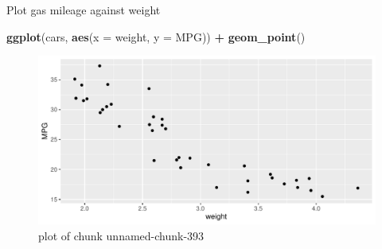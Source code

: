 \documentclass[ignorenonframetext,]{beamer}
\newenvironment{Shaded}{\begin{snugshade}}{\end{snugshade}}
\newcommand{\DataTypeTok}[1]{\textcolor[rgb]{0.13,0.29,0.53}{#1}}
\newcommand{\KeywordTok}[1]{\textcolor[rgb]{0.13,0.29,0.53}{\textbf{#1}}}
\newcommand{\NormalTok}[1]{#1}
\newcommand{\OperatorTok}[1]{\textcolor[rgb]{0.81,0.36,0.00}{\textbf{#1}}}
\newcommand{\StringTok}[1]{\textcolor[rgb]{0.31,0.60,0.02}{#1}}
\begin{document}
\begin{frame}[fragile]{Plot gas mileage against weight}
\protect\hypertarget{plot-gas-mileage-against-weight}{}

\begin{Shaded}
\begin{Highlighting}[]
\KeywordTok{ggplot}\NormalTok{(cars, }\KeywordTok{aes}\NormalTok{(}\DataTypeTok{x =}\NormalTok{ weight, }\DataTypeTok{y =}\NormalTok{ MPG)) }\OperatorTok{+}
\StringTok{  }\KeywordTok{geom_point}\NormalTok{()}
\end{Highlighting}
\end{Shaded}

\begin{figure}
\centering
\includegraphics{figure/unnamed-chunk-393-1.pdf}
\caption{plot of chunk unnamed-chunk-393}
\end{figure}

\end{frame}
\end{document}
